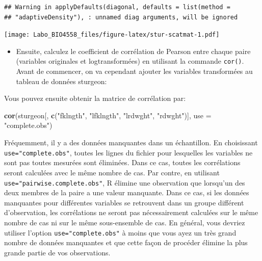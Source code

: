 \documentclass[
  12pt,
]{book}
\newenvironment{Shaded}{\begin{snugshade}}{\end{snugshade}}
\newcommand{\DataTypeTok}[1]{\textcolor[rgb]{0.13,0.29,0.53}{#1}}
\newcommand{\KeywordTok}[1]{\textcolor[rgb]{0.13,0.29,0.53}{\textbf{#1}}}
\newcommand{\NormalTok}[1]{#1}
\newcommand{\OperatorTok}[1]{\textcolor[rgb]{0.81,0.36,0.00}{\textbf{#1}}}
\newcommand{\StringTok}[1]{\textcolor[rgb]{0.31,0.60,0.02}{#1}}
\providecommand{\tightlist}{%
  \setlength{\itemsep}{0pt}\setlength{\parskip}{0pt}}
\begin{document}
\begin{verbatim}
## Warning in applyDefaults(diagonal, defaults = list(method =
## "adaptiveDensity"), : unnamed diag arguments, will be ignored
\end{verbatim}

\texttt{[image: Labo\_BIO4558\_files/figure-latex/stur-scatmat-1.pdf]}

\begin{itemize}
\tightlist
\item
  Ensuite, calculez le coefficient de corrélation de Pearson entre chaque paire (variables originales et logtransformées) en utilisant la commande \texttt{cor()}.
  Avant de commencer, on va cependant ajouter les variables transformées au tableau de données sturgeon:
\end{itemize}

\begin{Shaded}
\end{Shaded}

Vous pouvez ensuite obtenir la matrice de corrélation par:

\begin{Shaded}
\begin{Highlighting}[]
\KeywordTok{cor}\NormalTok{(sturgeon[, }\KeywordTok{c}\NormalTok{(}\StringTok{"fklngth"}\NormalTok{, }\StringTok{"lfklngth"}\NormalTok{, }\StringTok{"lrdwght"}\NormalTok{, }\StringTok{"rdwght"}\NormalTok{)], }\DataTypeTok{use =} \StringTok{"complete.obs"}\NormalTok{)}
\end{Highlighting}
\end{Shaded}

Fréquemment, il y a des données manquantes dans un échantillon.
En choisissant \texttt{use="complete.obs"}, toutes les lignes du fichier pour lesquelles les variables ne sont pas toutes mesurées sont éliminées.
Dans ce cas, toutes les corrélations seront calculées avec le même nombre de cas.
Par contre, en utilisant \texttt{use="pairwise.complete.obs"},
R élimine une observation que lorsqu'un des deux membres de la paire a une valeur manquante.
Dans ce cas, si les données manquantes pour différentes variables se retrouvent dans un groupe différent d'observation, les corrélations ne seront pas nécessairement calculées sur le même nombre de cas ni sur le même sous-ensemble de cas.
En général, vous devriez utiliser l'option \texttt{use="complete.obs"} à moins que vous ayez un très grand nombre de données manquantes et que cette façon de procéder élimine la plus grande partie de vos
observations.
\end{document}

